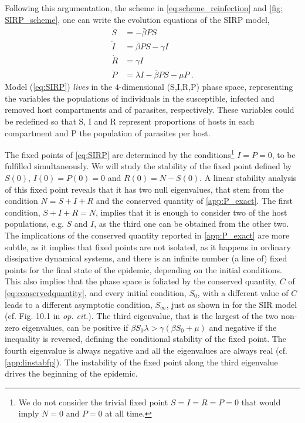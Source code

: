 Following this argumentation, the scheme in \cref{eq:scheme_reinfection}
and \cref{fig: SIRP_scheme}, one can write the evolution equations of the SIRP
model,
\begin{equation}\label{eq:SIRP}
    \begin{aligned}
        \dot{S} & =-\bar{\beta} P S                    \\
        \dot{I} & =\bar{\beta} P S-\gamma I            \\
        \dot{R} & =\gamma I                            \\
        \dot{P} & =\lambda I-\bar{\beta} P S-\mu P \ .
    \end{aligned}
\end{equation}
Model (\cref{eq:SIRP})	\textit{lives} in the $4$-dimensional (S,I,R,P)
phase space, representing the variables
the populations of individuals in the susceptible, infected and removed
host compartments and of parasites, respectively. These variables could be
redefined so that S, I and R represent proportions of hosts in each compartment
and P the population of parasites per host.

The fixed points of \cref{eq:SIRP} are determined by the
conditions\footnote{We do not consider the trivial fixed point $S=I=R=P=0$ that
    would imply $N=0$ and $P=0$ at all time.}
$I=P=0$, to be fulfilled simultaneously.
We will study the stability of the fixed point defined by $S(0)$,
$I(0)=P(0)=0$ and $R(0)=N-S(0)$.
A linear stability analysis of this fixed point reveals that it has two
null eigenvalues, that stem from the condition $N=S+I+R$ and the conserved
quantity of \ref{app:P_exact}.
The first condition, $S+I+R=N$, implies that it is enough to consider two
of the host populations, e.g. $S$ and $I$, as the third one can be obtained
from the other two. The implications of the conserved quantity reported in
\ref{app:P_exact} are more subtle, as it implies that fixed points are not
isolated, as it happens in ordinary dissipative dynamical systems, and there is
an infinite number (a line of) fixed points for the final state of the
epidemic, depending on the initial conditions. This also implies that the phase
space is foliated by the conserved quantity, $C$ of
\cref{eq:conservedquantity}, and every initial condition, $S_0$, with a
different value of $C$ leads to a different asymptotic condition, $S_{\infty}$,
just as shown in \cite{Murray_book} for the SIR model (cf. Fig. 10.1 in
\textit{op. cit.}).
The third eigenvalue, that is the largest of the two non-zero eigenvalues,
can be positive if $\beta S_0 \lambda>\gamma(\beta S_0+\mu)$ and negative if
the inequality is reversed, defining the conditional stability of the fixed
point. The fourth eigenvalue is always negative and all the eigenvalues are
always real (cf. \ref{app:linstabfp}).
The instability of the fixed point along the third eigenvalue drives the
beginning of the epidemic.

